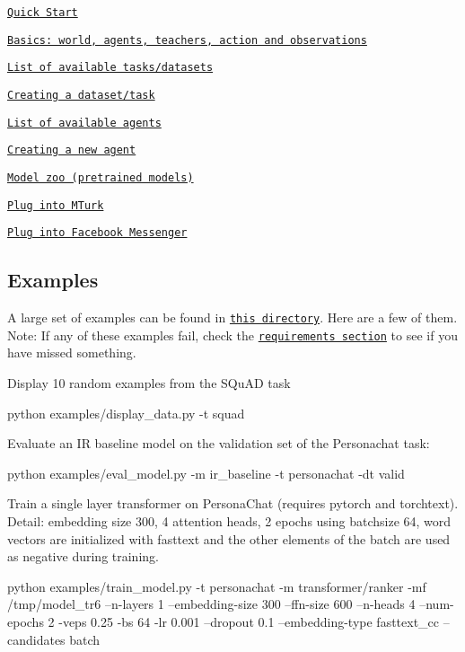 \begin{DoxyItemize}
\item \href{https://parl.ai/docs/tutorial_quick.html}{\tt Quick Start}
\item \href{https://parl.ai/docs/tutorial_basic.html}{\tt Basics\+: world, agents, teachers, action and observations}
\item \href{https://parl.ai/docs/tasks.html}{\tt List of available tasks/datasets}
\item \href{http://www.parl.ai/docs/tutorial_task.html}{\tt Creating a dataset/task}
\item \href{./parlai/agents}{\tt List of available agents}
\item \href{https://parl.ai/docs/tutorial_seq2seq.html#}{\tt Creating a new agent}
\item \href{https://parl.ai/docs/zoo.html}{\tt Model zoo (pretrained models)}
\item \href{http://parl.ai/docs/tutorial_mturk.html}{\tt Plug into M\+Turk}
\item \href{http://parl.ai/docs/tutorial_messenger.html}{\tt Plug into Facebook Messenger}
\end{DoxyItemize}

\subsection*{Examples}

A large set of examples can be found in \href{./examples}{\tt this directory}. Here are a few of them. Note\+: If any of these examples fail, check the \href{#requirements}{\tt requirements section} to see if you have missed something.

Display 10 random examples from the S\+Qu\+AD task 
\begin{DoxyCode}
python examples/display\_data.py -t squad
\end{DoxyCode}


Evaluate an IR baseline model on the validation set of the Personachat task\+: 
\begin{DoxyCode}
python examples/eval\_model.py -m ir\_baseline -t personachat -dt valid
\end{DoxyCode}


Train a single layer transformer on Persona\+Chat (requires pytorch and torchtext). Detail\+: embedding size 300, 4 attention heads, 2 epochs using batchsize 64, word vectors are initialized with fasttext and the other elements of the batch are used as negative during training. 
\begin{DoxyCode}
python examples/train\_model.py -t personachat -m transformer/ranker -mf /tmp/model\_tr6 --n-layers 1
       --embedding-size 300 --ffn-size 600 --n-heads 4 --num-epochs 2 -veps 0.25 -bs 64 -lr 0.001 --dropout 0.1
       --embedding-type fasttext\_cc --candidates batch
\end{DoxyCode}


